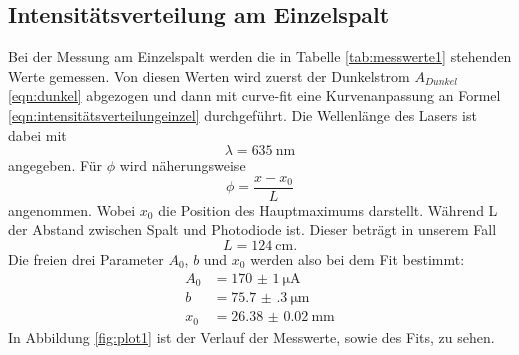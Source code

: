 \documentclass[
  bibliography=totoc,     %
  captions=tableheading,  %
  titlepage=firstiscover, %
]{scrartcl}
\begin{document}
\subsection{Intensitätsverteilung am Einzelspalt}
Bei der Messung am Einzelspalt werden die in Tabelle \ref{tab:messwerte1}
stehenden Werte gemessen. Von diesen Werten wird zuerst der Dunkelstrom
$A_{Dunkel}$ \eqref{eqn:dunkel} abgezogen und dann mit curve-fit eine
Kurvenanpassung an Formel \eqref{eqn:intensitätsverteilungeinzel}
durchgeführt. Die Wellenlänge des Lasers ist dabei mit
\begin{equation}
  \lambda = \SI{635}{\nano\meter}
\end{equation}
angegeben. Für $\phi$ wird näherungsweise
\begin{equation}
  \phi = \frac{x-x_0}{L}
\end{equation}
angenommen. Wobei $x_0$ die Position des Hauptmaximums darstellt. Während L
der Abstand zwischen Spalt und Photodiode ist. Dieser beträgt in unserem Fall
\begin{equation}
  L = \SI{124}{\centi\meter}.
\end{equation}
Die freien drei Parameter $A_0$, $b$ und $x_0$ werden also bei dem Fit
bestimmt:
\begin{align}
  A_0 &= \SI{170(1)}{\micro\ampere}\\
  b &= \SI{75.7(3)}{\micro\meter}\\
  x_0 &= \SI{26.38(2)}{\milli\meter}
\end{align}
In Abbildung \ref{fig:plot1} ist der Verlauf der Messwerte, sowie des Fits,
zu sehen.
\end{document}
